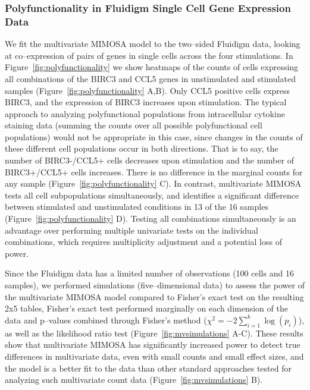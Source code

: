 \documentclass[11pt]{article}
\begin{document}
\subsubsection{Polyfunctionality in Fluidigm Single Cell Gene Expression Data}
We fit the multivariate MIMOSA model to the two--sided Fluidigm data, looking at co--expression of pairs of genes in single cells across the four stimulations. In Figure~\ref{fig:polyfunctionality} we show heatmaps of the counts of cells expressing all combinations of the BIRC3 and CCL5 genes in unstimulated and stimulated samples (Figure~\ref{fig:polyfunctionality} A,B). Only CCL5 positive cells express BIRC3, and the expression of BIRC3 increases upon stimulation. The typical approach to analyzing polyfunctional populations from intracellular cytokine staining data (summing the counts over all possible polyfunctional cell populations) would not be appropriate in this case, since changes in the counts of these different cell populations occur in both directions. That is to say, the number of BIRC3-/CCL5+ cells decreases upon stimulation and the number of BIRC3+/CCL5+ cells increases. There is no difference in the marginal counts for any sample (Figure~\ref{fig:polyfunctionality} C). In contrast, multivariate MIMOSA tests all cell subpopulations simultaneously, and identifies a significant difference between stimulated and unstimulated conditions in 13 of the 16 samples (Figure~\ref{fig:polyfunctionality} D). Testing all combinations simultaneously is an advantage over performing multiple univariate tests on the individual combinations, which requires multiplicity adjustment and a potential loss of power. 

Since the Fluidigm data has a limited number of observations (100 cells and 16 samples), we performed simulations (five--dimensional data) to assess the power of the multivariate MIMOSA  model compared to Fisher's exact test on the resulting 2x5 tables, Fisher's exact test performed marginally on each dimension of the data and p--values combined through Fisher's method ($\chi^2=-2\sum_{i=1}^k\log(p_i)$), as well as the likelihood ratio test (Figure~\ref{fig:mvsimulations} A-C). These results show that multivariate MIMOSA has significantly increased power to detect true differences in multivariate data, even with small counts and small effect sizes, and the model is a better fit to the data than other standard approaches tested for analyzing such multivariate count data (Figure~\ref{fig:mvsimulations} B). 
\end{document}
